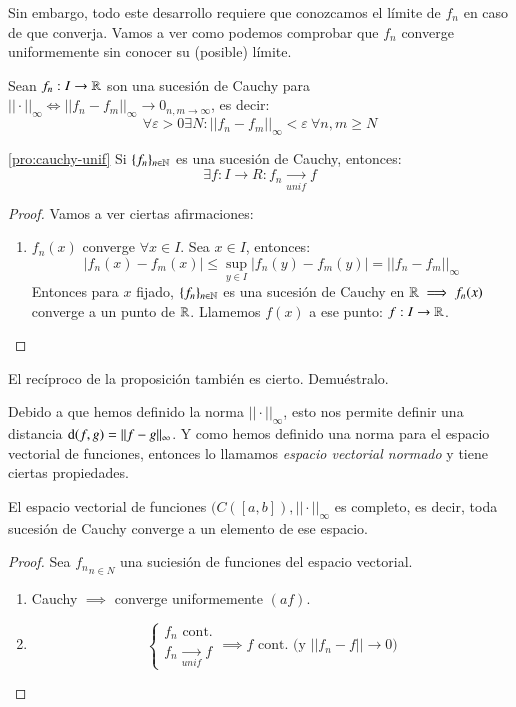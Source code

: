 Sin embargo, todo este desarrollo requiere que conozcamos el límite de $f_n$ en caso de que converja. Vamos a ver como podemos comprobar que $f_n$ converge uniformemente sin conocer su (posible) límite.
\begin{dfn}
    Sean $f_n : I \to \mathbb{R}$ son una sucesión de Cauchy para $||\cdot||_\infty \iff ||f_n - f_m||_\infty \to 0_{n,m \to \infty}$, es decir:
    $$
        \forall \varepsilon > 0 \exists N : ||f_n - f_m||_\infty < \varepsilon\ \forall n,m \geq N
    $$
\end{dfn}
\begin{pro}\ref{pro:cauchy-unif}
    Si $\{f_n\}_{n\in\mathbb{N}}$ es una sucesión de Cauchy, entonces:
    $$
        \exists f : I \to R : f_n \xrightarrow[unif]{} f
    $$
\end{pro}
\begin{proof}
    Vamos a ver ciertas afirmaciones:
    \begin{enumerate}
        \item $f_n(x)$ converge $\forall x \in I$. Sea $x\in I$, entonces:
        $$
            |f_n(x) - f_m(x) | \leq \sup_{y\in I} |f_n(y) - f_m(y)| = ||f_n - f_m||_\infty
        $$
        Entonces para $x$ fijado, $\{f_n\}_{n\in\mathbb{N}}$ es una sucesión de Cauchy en $\mathbb{R} \implies f_n(x)$ converge a un punto de $\mathbb{R}$. Llamemos $f(x)$ a ese punto: $f : I \to \mathbb{R}$.
    \end{enumerate}
\end{proof}
\begin{th_ex}
    El recíproco de la proposición \label{pro:cauchy-unif} también es cierto. Demuéstralo.
\end{th_ex}
Debido a que hemos definido la norma $||\cdot||_\infty$, esto nos permite definir una distancia $\mathrm{d}(f, g) = || f -g || _\infty$. Y como hemos definido una norma para el espacio vectorial de funciones, entonces lo llamamos \textit{espacio vectorial normado} y tiene ciertas propiedades.
\begin{pro}
    El espacio vectorial de funciones $(C([a, b]), ||\cdot||_\infty$ es completo, es decir, toda sucesión de Cauchy converge a un elemento de ese espacio.
\end{pro}
\begin{proof}
    Sea ${f_n}_{n\in N}$ una suciesión de funciones del espacio vectorial.
    \begin{enumerate}
        \item Cauchy $\implies$ converge uniformemente $( a f)$.
        \item
            $$
                \begin{cases}
                    f_n \text{ cont.}\\
                    f_n \xrightarrow[unif]{} f
                \end{cases} \implies f \text{ cont. (y $||f_n - f|| \to 0$)}
            $$
    \end{enumerate}
\end{proof}
